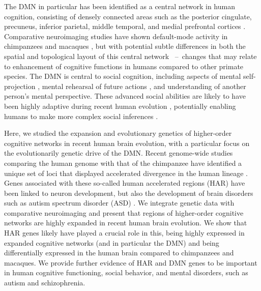 \begin{refsection}
The DMN in particular has been identified as a central network in human cognition, consisting of densely connected areas such as the posterior cingulate, precuneus, inferior parietal, middle temporal, and medial prefrontal cortices \citep{buckner2008brain,raichle2015brain}. Comparative neuroimaging studies have shown default-mode activity in chimpanzees \citep{barks2013default} and macaques \citep{mantini2011default}, but with potential subtle differences in both the spatial and topological layout of this central network \citep{miranda2014bridging}\ --\ changes that may relate to enhancement of cognitive functions in humans compared to other primate species. The DMN is central to social cognition, including aspects of mental self-projection \citep{buckner2007self}, mental rehearsal of future actions \citep{tulving2005episodic}, and understanding of another person’s mental perspective. These advanced social abilities are likely to have been highly adaptive during recent human evolution \citep{tomasello2010ape}, potentially enabling humans to make more complex social inferences \citep{buckner2007self}.

Here, we studied the expansion and evolutionary genetics of higher-order cognitive networks in recent human brain evolution, with a particular focus on the evolutionarily genetic drive of the DMN. Recent genome-wide studies comparing the human genome with that of the chimpanzee have identified a unique set of loci that displayed accelerated divergence in the human lineage \citep{pollard2006rna,pollard2006forces}. Genes associated with these so-called human accelerated regions (HAR) have been linked to neuron development, but also the development of brain disorders such as autism spectrum disorder (ASD) \citep{doan2016mutations}. We integrate genetic data with comparative neuroimaging and present that regions of higher-order cognitive networks are highly expanded in recent human brain evolution. We show that HAR genes likely have played a crucial role in this, being highly expressed in expanded cognitive networks (and in particular the DMN) and being differentially expressed in the human brain compared to chimpanzees and macaques. We provide further evidence of HAR and DMN genes to be important in human cognitive functioning, social behavior, and mental disorders, such as autism and schizophrenia.


\end{refsection}
